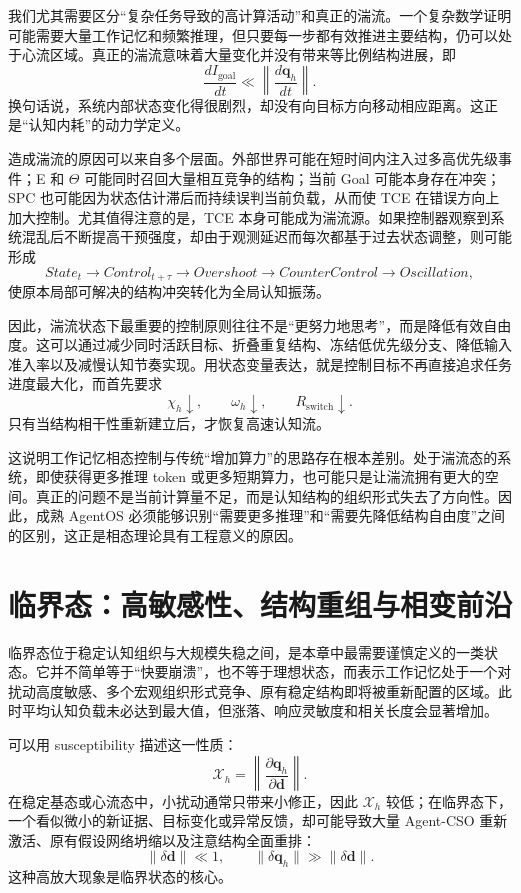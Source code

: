 我们尤其需要区分“复杂任务导致的高计算活动”和真正的湍流。一个复杂数学证明可能需要大量工作记忆和频繁推理，但只要每一步都有效推进主要结构，仍可以处于心流区域。真正的湍流意味着大量变化并没有带来等比例结构进展，即
\[
\frac{dI_{\mathrm{goal}}}{dt}
\ll
\left\|
\frac{d\mathbf q_h}{dt}
\right\|.
\]
换句话说，系统内部状态变化得很剧烈，却没有向目标方向移动相应距离。这正是“认知内耗”的动力学定义。

造成湍流的原因可以来自多个层面。外部世界可能在短时间内注入过多高优先级事件；E 和 $\Theta$ 可能同时召回大量相互竞争的结构；当前 Goal 可能本身存在冲突；SPC 也可能因为状态估计滞后而持续误判当前负载，从而使 TCE 在错误方向上加大控制。尤其值得注意的是，TCE 本身可能成为湍流源。如果控制器观察到系统混乱后不断提高干预强度，却由于观测延迟而每次都基于过去状态调整，则可能形成
\[
State_t
\rightarrow
Control_{t+\tau}
\rightarrow
Overshoot
\rightarrow
CounterControl
\rightarrow
Oscillation,
\]
使原本局部可解决的结构冲突转化为全局认知振荡。

因此，湍流状态下最重要的控制原则往往不是“更努力地思考”，而是降低有效自由度。这可以通过减少同时活跃目标、折叠重复结构、冻结低优先级分支、降低输入准入率以及减慢认知节奏实现。用状态变量表达，就是控制目标不再直接追求任务进度最大化，而首先要求
\[
\chi_h\downarrow,\qquad
\omega_h\downarrow,\qquad
R_{\mathrm{switch}}\downarrow.
\]
只有当结构相干性重新建立后，才恢复高速认知流。

这说明工作记忆相态控制与传统“增加算力”的思路存在根本差别。处于湍流态的系统，即使获得更多推理 token 或更多短期算力，也可能只是让湍流拥有更大的空间。真正的问题不是当前计算量不足，而是认知结构的组织形式失去了方向性。因此，成熟 AgentOS 必须能够识别“需要更多推理”和“需要先降低结构自由度”之间的区别，这正是相态理论具有工程意义的原因。

\section{临界态：高敏感性、结构重组与相变前沿}

临界态位于稳定认知组织与大规模失稳之间，是本章中最需要谨慎定义的一类状态。它并不简单等于“快要崩溃”，也不等于理想状态，而表示工作记忆处于一个对扰动高度敏感、多个宏观组织形式竞争、原有稳定结构即将被重新配置的区域。此时平均认知负载未必达到最大值，但涨落、响应灵敏度和相关长度会显著增加。

可以用 susceptibility 描述这一性质：
\[
\mathcal X_h
=
\left\|
\frac{\partial\mathbf q_h}
{\partial \mathbf d}
\right\|.
\]
在稳定基态或心流态中，小扰动通常只带来小修正，因此 $\mathcal X_h$ 较低；在临界态下，一个看似微小的新证据、目标变化或异常反馈，却可能导致大量 Agent-CSO 重新激活、原有假设网络坍缩以及注意结构全面重排：
\[
\|\delta \mathbf d\|\ll 1,
\qquad
\|\delta\mathbf q_h\|\gg \|\delta\mathbf d\|.
\]
这种高放大现象是临界状态的核心。

